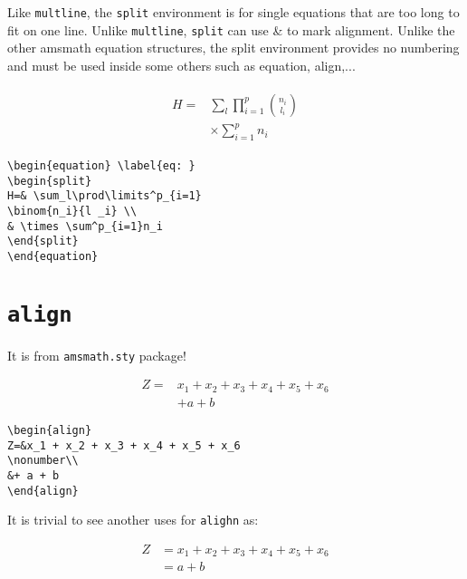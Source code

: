 \documentclass[journal]{IEEEtran}
\begin{document}
Like \verb!multline!, the \verb!split! environment is for single equations that are too long
to fit on one line. Unlike \verb!multline!, \verb!split! can use \& to mark alignment. 
Unlike the other amsmath equation structures, the split environment provides no numbering and must be used inside some others such as equation, align,...

\begin{equation}
\begin{split}
\begin{split}
H=& \sum_l\prod\limits^p_{i=1} 
\binom{n_i}{l _i} \\
& \times \sum^p_{i=1}n_i
\end{split}
\end{split}
\end{equation}

\begin{verbatim}
\begin{equation} \label{eq: }
\begin{split}
H=& \sum_l\prod\limits^p_{i=1} 
\binom{n_i}{l _i} \\
& \times \sum^p_{i=1}n_i
\end{split}
\end{equation}
\end{verbatim}

\noindent \dotfill
\section{\texttt{align}}
It is from \texttt{amsmath.sty} package!

\begin{align}
Z=&x_1 + x_2 + x_3 + x_4 + x_5 + x_6  \nonumber\\
&+ a + b
\end{align}

\begin{verbatim}
\begin{align}
Z=&x_1 + x_2 + x_3 + x_4 + x_5 + x_6  
\nonumber\\
&+ a + b
\end{align}
\end{verbatim}


It is trivial to see another uses for \verb!alighn! as:

\begin{align}
Z&=x_1+x_2+x_3+x_4+x_5+x_6\nonumber\\
&=a + b
\end{align}
\end{document}
